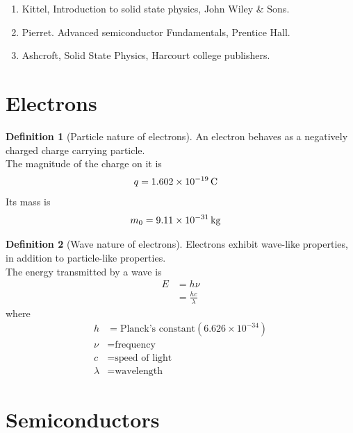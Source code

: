 \documentclass[titlepage, fleqn, a4paper, 12pt, twoside]{article}
\theoremstyle{definition}
\newtheorem{definition}{Definition}
\theoremstyle{theorem}
\let\Oldsection\section
\renewcommand{\section}{\FloatBarrier\Oldsection}
\begin{document}
\begin{enumerate}
	\item Kittel, Introduction to solid state physics, John Wiley \& Sons.
	\item Pierret. Advanced semiconductor Fundamentals, Prentice Hall.
	\item Ashcroft, Solid State Physics, Harcourt college publishers.
\end{enumerate}

\newpage
\section{Electrons}

\begin{definition}[Particle nature of electrons]
	An electron behaves as a negatively charged charge carrying particle.\\
	The magnitude of the charge on it is
	\begin{align*}
		q & = 1.602 \times 10^{-19} \coulomb
	\end{align*}
	Its mass is
	\begin{align*}
		m_0 & = 9.11 \times 10^{-31} \kilogram
	\end{align*}
\end{definition}

\begin{definition}[Wave nature of electrons]
	Electrons exhibit wave-like properties, in addition to particle-like properties.\\
	The energy transmitted by a wave is
	\begin{align*}
		E & = h \nu \\
                  & = \frac{h c}{\lambda}
	\end{align*}
	where
	\begin{align*}
		h       & = \text{Planck's constant} \left( 6.626 \times 10^{-34} \right) \\
		\nu     & = \text{frequency}                                              \\
		c       & = \text{speed of light}                                         \\
		\lambda & = \text{wavelength}
	\end{align*}
\end{definition}

\section{Semiconductors}
\end{document}
